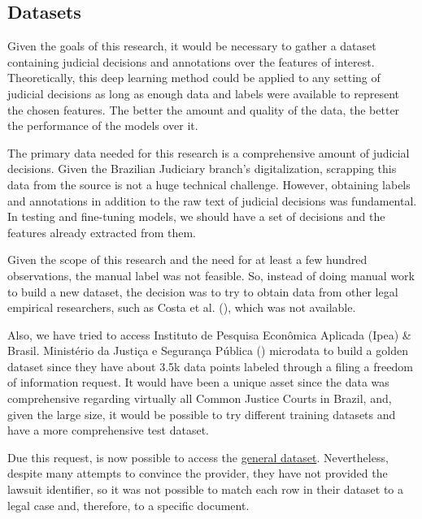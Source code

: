 \documentclass[
  12pt,
]{article}
\begin{document}
\subsection{Datasets}\label{sec-datasets}

Given the goals of this research, it would be necessary to gather a
dataset containing judicial decisions and annotations over the features
of interest. Theoretically, this deep learning method could be applied
to any setting of judicial decisions as long as enough data and labels
were available to represent the chosen features. The better the amount
and quality of the data, the better the performance of the models over
it.

The primary data needed for this research is a comprehensive amount of
judicial decisions. Given the Brazilian Judiciary branch's
digitalization, scrapping this data from the source is not a huge
technical challenge. However, obtaining labels and annotations in
addition to the raw text of judicial decisions was fundamental. In
testing and fine-tuning models, we should have a set of decisions and
the features already extracted from them.

Given the scope of this research and the need for at least a few hundred
observations, the manual label was not feasible. So, instead of doing
manual work to build a new dataset, the decision was to try to obtain
data from other legal empirical researchers, such as Costa et al.
(), which was not available.

Also, we have tried to access Instituto de Pesquisa Econômica Aplicada
(Ipea) \& Brasil. Ministério da Justiça e Segurança Pública
()
microdata to build a golden dataset since they have about 3.5k data
points labeled through a filing a freedom of information request. It
would have been a unique asset since the data was comprehensive
regarding virtually all Common Justice Courts in Brazil, and, given the
large size, it would be possible to try different training datasets and
have a more comprehensive test dataset.

Due this request, is now possible to access the
\href{https://www.gov.br/mj/pt-br/assuntos/sua-protecao/politicas-sobre-drogas/pesquisa-e-informacao-3/pesquisa\%20IPEA/pesquisa-ipea-perfil-processado-e-producao-de-provas}{general
dataset}. Nevertheless, despite many attempts to convince the provider,
they have not provided the lawsuit identifier, so it was not possible to
match each row in their dataset to a legal case and, therefore, to a
specific document.
\end{document}

